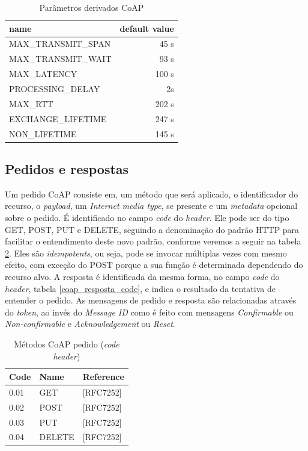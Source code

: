 \begin{table}[!htb]
	\centering
	\footnotesize\setlength{\tabcolsep}{25pt}
	\caption{Parâmetros derivados CoAP}
	\label{coap_parametro_deriv}
	\begin{tabular}{l|r}
		\hline
		name                & \multicolumn{1}{l}{default value} \\ \hline
		MAX\_TRANSMIT\_SPAN & 45 s                               \\ \hline
		MAX\_TRANSMIT\_WAIT & 93 s                               \\ \hline
		MAX\_LATENCY        & 100 s                              \\ \hline
		PROCESSING\_DELAY   & 2s                                 \\ \hline
		MAX\_RTT            & 202 s                              \\ \hline
		EXCHANGE\_LIFETIME  & 247 s                              \\ \hline
		NON\_LIFETIME       & 145 s                              \\ \hline
	\end{tabular}
\end{table}


\subsection{Pedidos e respostas}


Um pedido CoAP consiste em, um método que será aplicado, o identificador do recurso, o \textit{payload}, um \textit{Internet media type}, se presente e um \textit{metadata} opcional sobre o pedido. É identificado no campo \textit{code} do \textit{header}. Ele pode ser do tipo GET, POST, PUT e DELETE, seguindo a denominação do padrão HTTP para facilitar o entendimento deste novo padrão, conforme veremos a seguir na tabela \ref{coap_code_method}. Eles são \textit{idempotents}, ou seja, pode se invocar múltiplas vezes com mesmo efeito, com exceção do POST porque a sua função é determinada dependendo do recurso alvo.
A resposta é identificada da mesma forma, no campo \textit{code} do \textit{header}, tabela \ref{coap_resposta_code}, e indica o resultado da tentativa de entender o pedido.
As mensagens de pedido e resposta são relacionadas através do \textit{token}, ao invés do \textit{Message ID} como é feito com mensagens \textit{Confirmable} ou \textit{Non-confirmable} e \textit{Acknowledgement} ou \textit{Reset}.

\begin{table}[!htb]
	\centering
	\caption{Métodos CoAP pedido (\textit{code} \textit{header})}
	\label{coap_code_method}
	\begin{tabular}{l|l|l}
		\hline
		Code & Name    & Reference     \\ \hline
		0.01 & GET     & {[}RFC7252{]} \\ \hline
		0.02 & POST    & {[}RFC7252{]} \\ \hline
		0.03 & PUT     & {[}RFC7252{]} \\ \hline
		0.04 & DELETE  & {[}RFC7252{]} \\ \hline
	\end{tabular}
\end{table}

